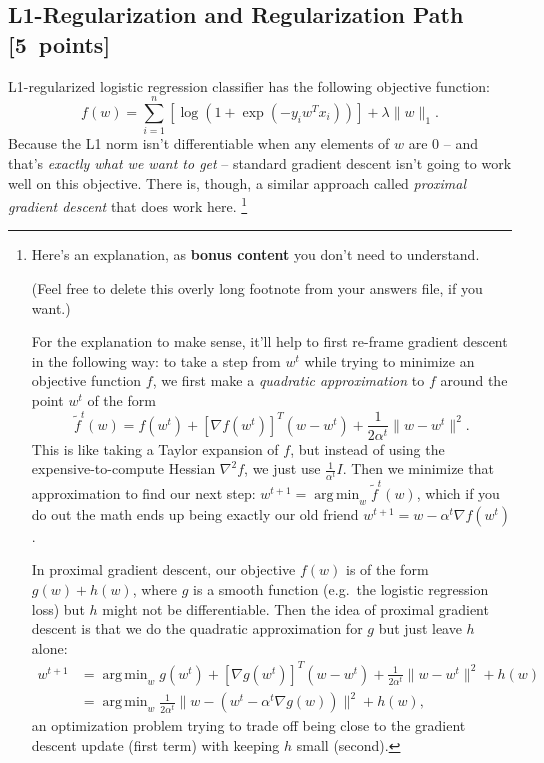 \documentclass{article}
\newcommand\pts[1]{\textcolor{pointscolour}{[#1~points]}}
\DeclareMathOperator*{\argmin}{arg\,min}
\newcommand{\norm}[1]{\lVert #1 \rVert}
\begin{document}
\subsection{L1-Regularization and Regularization Path \pts{5}}
L1-regularized logistic regression classifier has the following objective function:
\[
f(w) = \sum_{i=1}^n \left[\log(1+\exp(-y_iw^Tx_i))\right] + \lambda\norm{w}_1.
\]
Because the L1 norm isn't differentiable when any elements of $w$ are $0$ -- and that's \emph{exactly what we want to get} -- standard gradient descent isn't going to work well on this objective.
There is, though, a similar approach called \emph{proximal gradient descent} that does work here.%
\footnote{%
    Here's an explanation, as \textbf{bonus content} you don't need to understand.

    (Feel free to delete this overly long footnote from your answers file, if you want.)

    For the explanation to make sense, it'll help to first re-frame gradient descent in the following way:
    to take a step from $w^t$ while trying to minimize an objective function $f$,
    we first make a \emph{quadratic approximation} to $f$ around the point $w^t$ of the form
    \[
        \tilde f^t(w) = f(w^t) + [\nabla f(w^t)]^T (w - w^t) + \frac{1}{2 \alpha^t} \norm{w - w^t}^2
    .\]
    This is like taking a Taylor expansion of $f$,
    but instead of using the expensive-to-compute Hessian $\nabla^2 f$,
    we just use $\frac{1}{\alpha^t} I$.
    Then we minimize that approximation to find our next step:
    $w^{t+1} = \argmin_{w} \tilde{f}^t(w)$,
    which if you do out the math ends up being exactly our old friend $w^{t+1} = w - \alpha^t \nabla f(w^t)$.\footnotemark

    In proximal gradient descent, our objective $f(w)$ is of the form $g(w) + h(w)$,
    where $g$ is a smooth function (e.g.\ the logistic regression loss)
    but $h$ might not be differentiable.
    Then the idea of proximal gradient descent is that we do the quadratic approximation for $g$ but just leave $h$ alone:
    \begin{align*}
         w^{t+1}
      &= \argmin_w g(w^t) + [\nabla g(w^t)]^T (w - w^t) + \frac{1}{2 \alpha^t} \norm{w - w^t}^2 + h(w)
    \\&= \argmin_w \frac{1}{2 \alpha^t} \norm{w - (w^t - \alpha^t \nabla g(w))}^2 + h(w)
    \tag{prox} \label{eq:prox}
    ,\end{align*}
    an optimization problem trying to trade off being close to the gradient descent update (first term) with keeping $h$ small (second).

}
\end{document}
